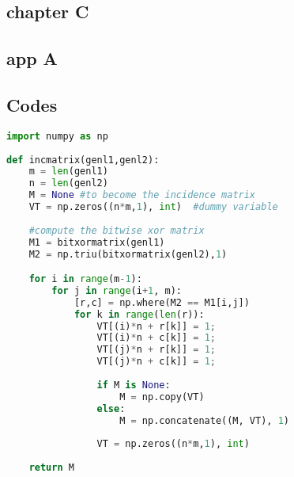 \begin{appendices}
\chapter{chapter C}
\zhlipsum[13]

\section{app A}
\zhlipsum[14-15]

\section{Codes}
\begin{lstlisting}[language=Python]
import numpy as np
    
def incmatrix(genl1,genl2):
    m = len(genl1)
    n = len(genl2)
    M = None #to become the incidence matrix
    VT = np.zeros((n*m,1), int)  #dummy variable
    
    #compute the bitwise xor matrix
    M1 = bitxormatrix(genl1)
    M2 = np.triu(bitxormatrix(genl2),1) 

    for i in range(m-1):
        for j in range(i+1, m):
            [r,c] = np.where(M2 == M1[i,j])
            for k in range(len(r)):
                VT[(i)*n + r[k]] = 1;
                VT[(i)*n + c[k]] = 1;
                VT[(j)*n + r[k]] = 1;
                VT[(j)*n + c[k]] = 1;
                
                if M is None:
                    M = np.copy(VT)
                else:
                    M = np.concatenate((M, VT), 1)
                
                VT = np.zeros((n*m,1), int)
    
    return M
\end{lstlisting}


\end{appendices}
